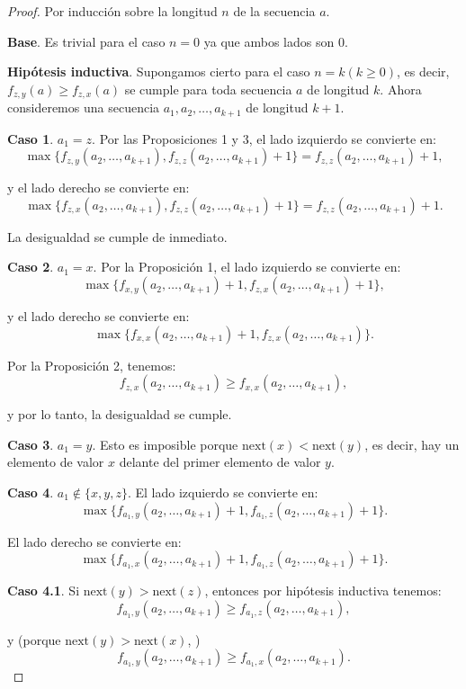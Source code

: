 \documentclass{article}
\begin{document}
\begin{proof}
Por inducción sobre la longitud $n$ de la secuencia $a$.

\textbf{Base}. Es trivial para el caso $n=0$ ya que ambos lados son 0.

\textbf{Hipótesis inductiva}. Supongamos cierto para el caso $n=k (k \geq 0)$, es decir,
$f_{z,y}(a) \geq f_{z,x}(a)$
se cumple para toda secuencia $a$ de longitud $k$. Ahora consideremos una secuencia $a_1, a_2, \ldots, a_{k+1}$ de longitud $k+1$.

\textbf{Caso 1}. $a_1 = z$. Por las Proposiciones 1 y 3, el lado izquierdo se convierte en:
$$
\max \{f_{z,y}(a_2, \ldots, a_{k+1}), f_{z,z}(a_2, \ldots, a_{k+1}) + 1\} = f_{z,z}(a_2, \ldots, a_{k+1}) + 1,
$$

y el lado derecho se convierte en:
$$
\max \{f_{z,x}(a_2, \ldots, a_{k+1}), f_{z,z}(a_2, \ldots, a_{k+1}) + 1\} = f_{z,z}(a_2, \ldots, a_{k+1}) + 1.
$$

La desigualdad se cumple de inmediato.

\textbf{Caso 2}. $a_1 = x$. Por la Proposición 1, el lado izquierdo se convierte en:
$$
\max \{f_{x,y}(a_2, \ldots, a_{k+1}) + 1, f_{z,x}(a_2, \ldots, a_{k+1}) + 1\},
$$

y el lado derecho se convierte en:
$$
\max \{f_{x,x}(a_2, \ldots, a_{k+1}) + 1, f_{z,x}(a_2, \ldots, a_{k+1})\}.
$$

Por la Proposición 2, tenemos:
$$
f_{z,x}(a_2, \ldots, a_{k+1}) \geq f_{x,x}(a_2, \ldots, a_{k+1}),
$$

y por lo tanto, la desigualdad se cumple.

\textbf{Caso 3}. $a_1 = y$. Esto es imposible porque $\text{next}(x) < \text{next}(y)$, es decir, hay un elemento de valor $x$ delante del primer elemento de valor $y$.

\textbf{Caso 4}. $a_1 \notin \{x, y, z\}$. El lado izquierdo se convierte en:
$$
\max \{f_{a_1,y}(a_2, \ldots, a_{k+1}) + 1, f_{a_1,z}(a_2, \ldots, a_{k+1}) + 1\}.
$$

El lado derecho se convierte en:
$$
\max \{f_{a_1,x}(a_2, \ldots, a_{k+1}) + 1, f_{a_1,z}(a_2, \ldots, a_{k+1}) + 1\}.
$$


\textbf{Caso 4.1}. Si $\text{next}(y) > \text{next}(z)$, entonces por hipótesis inductiva tenemos:
$$
f_{a_1,y}(a_2, \ldots, a_{k+1}) \geq f_{a_1,z}(a_2, \ldots, a_{k+1}),
$$

y (porque $\text{next}(y) > \text{next}(x)$, )
$$
f_{a_1,y}(a_2, \ldots, a_{k+1}) \geq f_{a_1,x}(a_2, \ldots, a_{k+1}).
$$


\end{proof}
\end{document}

